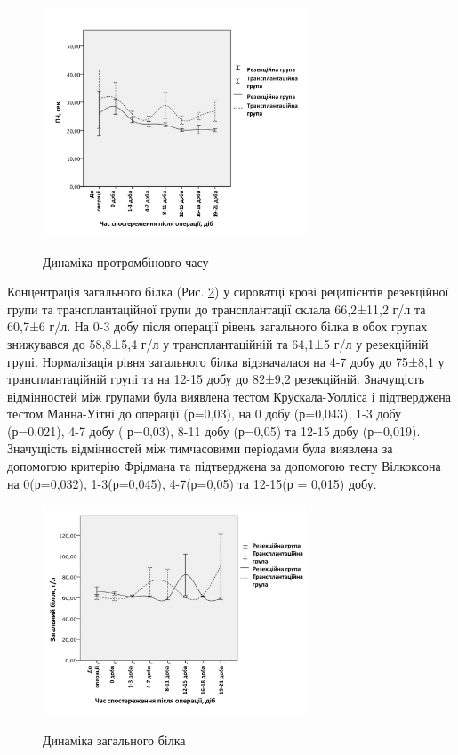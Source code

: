 \begin{figure}[h]
\caption{Динаміка протромбіновго часу}
\centering
\includegraphics[width=0.7\textwidth]{Illustrations/graf/pv.jpeg}
\label{fig:pv} 
\end{figure}

Концентрація загального білка (Рис. \ref{fig:zbilok}) у сироватці крові реципієнтів резекційної групи та трансплантаційної групи до трансплантації склала 66,2±11,2 г/л та 60,7±6 г/л. На 0-3 добу після операції рівень загального білка в обох групах знижувався до 58,8±5,4 г/л у трансплантаційній та 64,1±5 г/л у резекційній групі. Нормалізація рівня загального білка відзначалася на 4-7 добу до 75±8,1 у трансплантаційній групі та на 12-15 добу до 82±9,2 резекційній. Значущість відмінностей між групами була виявлена тестом Крускала-Уолліса і підтверджена тестом Манна-Уітні до операції (р=0,03), на 0 добу (р=0,043), 1-3 добу (р=0,021), 4-7 добу ( р=0,03), 8-11 добу (р=0,05) та 12-15 добу (р=0,019). Значущість відмінностей між тимчасовими періодами була виявлена за допомогою критерію Фрідмана та підтверджена за допомогою тесту Вілкоксона на 0(р=0,032), 1-3(р=0,045), 4-7(р=0,05) та 12-15(р = 0,015) добу.

\begin{figure}[h]
\caption{Динаміка загального білка}
\centering
\includegraphics[width=0.7\textwidth]{Illustrations/graf/zbilok.jpeg}
\label{fig:zbilok} 
\end{figure}

